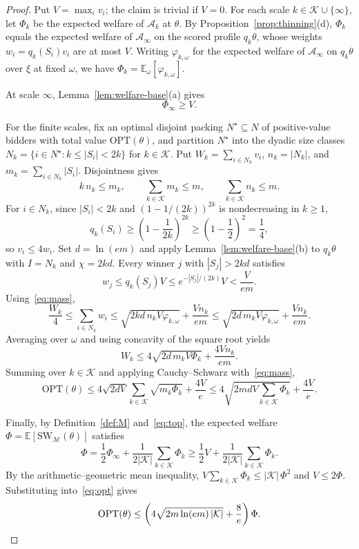 \documentclass[format=acmsmall, review=false]{acmart}
\newcommand{\E}{\mathbb{E}}
\newcommand{\OPT}{\mathrm{OPT}}
\newcommand{\SW}{\mathrm{SW}}
\theoremstyle{acmdefinition}%
\begin{document}
\begin{proof}
Put \(V=\max_i v_i\); the claim is trivial if \(V=0\). For each
scale \(k\in\mathcal K\cup\{\infty\}\), let \(\Phi_k\) be the
expected welfare of \(\mathcal A_k\) at \(\theta\). By
Proposition~\ref{prop:thinning}(d), \(\Phi_k\) equals the expected
welfare of \(\mathcal A_\infty\) on the scored profile
\(q_k\theta\), whose weights \(w_i=q_k(S_i)v_i\) are at most
\(V\). Writing \(\varphi_{k,\omega}\) for the expected welfare of
\(\mathcal A_\infty\) on \(q_k\theta\) over \(\xi\) at fixed
\(\omega\), we have \(\Phi_k=\E_\omega[\varphi_{k,\omega}]\).

At scale \(\infty\), Lemma~\ref{lem:welfare-base}(a) gives
\begin{equation}\label{eq:top}
\Phi_\infty\ge V.
\end{equation}

For the finite scales, fix an optimal disjoint packing
\(N^\star\subseteq N\) of positive-value bidders with total value
\(\OPT(\theta)\), and
partition \(N^\star\) into the dyadic size classes
\(N_k=\{i\in N^\star:k\le|S_i|<2k\}\) for \(k\in\mathcal K\). Put
\(W_k=\sum_{i\in N_k}v_i\), \(n_k=|N_k|\), and
\(m_k=\sum_{i\in N_k}|S_i|\). Disjointness gives
\begin{equation}\label{eq:mass}
k\,n_k\le m_k,\qquad
\sum_{k\in\mathcal K}m_k\le m,\qquad
\sum_{k\in\mathcal K}n_k\le m.
\end{equation}
For \(i\in N_k\), since \(|S_i|<2k\) and \((1-1/(2k))^{2k}\) is
nondecreasing in \(k\ge1\),
\[
q_k(S_i)\ge\left(1-\frac{1}{2k}\right)^{2k}
\ge\left(1-\frac12\right)^2=\frac14,
\]
so \(v_i\le4w_i\). Set \(d=\ln(em)\) and apply
Lemma~\ref{lem:welfare-base}(b) to \(q_k\theta\) with \(I=N_k\)
and \(\chi=2kd\). Every winner \(j\) with \(|S_j|>2kd\) satisfies
\[
w_j\le q_k(S_j)V\le e^{-|S_j|/(2k)}V<\frac{V}{em}.
\]
Using~\eqref{eq:mass},
\[
\frac{W_k}{4}
\le\sum_{i\in N_k}w_i
\le\sqrt{2kd\,n_k V\varphi_{k,\omega}}+\frac{Vn_k}{em}
\le\sqrt{2d\,m_k V\varphi_{k,\omega}}+\frac{Vn_k}{em}.
\]
Averaging over \(\omega\) and using concavity of the square root
yields
\[
W_k\le4\sqrt{2d\,m_k V\Phi_k}+\frac{4Vn_k}{em}.
\]
Summing over \(k\in\mathcal K\) and applying Cauchy--Schwarz
with~\eqref{eq:mass},
\begin{equation}\label{eq:opt}
\OPT(\theta)
\le 4\sqrt{2dV}\sum_{k\in\mathcal K}\sqrt{m_k\Phi_k}+\frac{4V}{e}
\le 4\sqrt{2mdV\sum_{k\in\mathcal K}\Phi_k}+\frac{4V}{e}.
\end{equation}

Finally, by Definition~\ref{def:M} and~\eqref{eq:top}, the
expected welfare \(\Phi=\E[\SW_{\mathcal M}(\theta)]\) satisfies
\[
\Phi
=\frac12\Phi_\infty+\frac{1}{2|\mathcal K|}\sum_{k\in\mathcal K}\Phi_k
\ge\frac12 V+\frac{1}{2|\mathcal K|}\sum_{k\in\mathcal K}\Phi_k.
\]
By the arithmetic--geometric mean inequality,
\(V\sum_{k\in\mathcal K}\Phi_k\le|\mathcal K|\,\Phi^2\) and
\(V\le2\Phi\). Substituting into~\eqref{eq:opt} gives
\[
\OPT(\theta)
\le\left(4\sqrt{2m\ln(em)\,|\mathcal K|}+\frac8e\right)\Phi.
\qedhere
\]
\end{proof}
\end{document}
